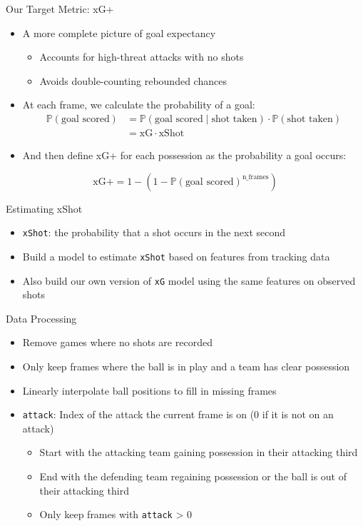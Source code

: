\documentclass{beamer}
\begin{document}
\begin{frame}{Our Target Metric: xG+}
\begin{itemize}
\item A more complete picture of goal expectancy
  \begin{itemize}
  \item Accounts for high-threat attacks with no shots
  \item Avoids double-counting rebounded chances
  \end{itemize}
\item At each frame, we calculate the probability of a goal:
\begin{align*}
\mathbb{P}(\text{goal scored}) &= \mathbb{P}(\text{goal scored} \mid \text{shot taken})\cdot\mathbb{P}(\text{shot taken}) \\
  &= \text{xG}\cdot\text{xShot}
\end{align*}
\item And then define xG+ for each possession as the probability a goal occurs:
\end{itemize}
$$\text{xG+} = 1 - (1 - \mathbb{P}(\text{goal scored})^{\text{n\_frames}})$$
\end{frame}

\begin{frame}{Estimating xShot}
\begin{itemize}
\item \texttt{xShot}: the probability that a shot occurs in the next second
\item Build a model to estimate \texttt{xShot} based on features from tracking data
\item Also build our own version of \texttt{xG} model using the same features on observed shots
\end{itemize}
\end{frame}

\begin{frame}{Data Processing}
\begin{itemize}
\item Remove games where no shots are recorded
\item Only keep frames where the ball is in play and a team has clear possession
\item Linearly interpolate ball positions to fill in missing frames
\item \texttt{attack}: Index of the attack the current frame is on (0 if it is not on an attack)
  \begin{itemize}
  \item Start with the attacking team gaining possession in their attacking third
  \item End with the defending team regaining possession or the ball is out of their attacking third
  \item Only keep frames with \texttt{attack} > 0
  \end{itemize}
\end{itemize}
\end{frame}
\end{document}

